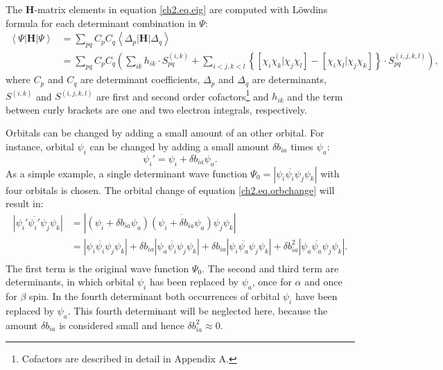 The $\mathbf{H}$-matrix elements in equation \ref{ch2.eq.eig} are computed with L\"{o}wdins formula for each determinant combination in $\Psi$:
\begin{equation}
\begin{split}
\left< \Psi | \mathbf{H} | \Psi \right> &= \sum_{pq} C_p C_q \left< \Delta_p | \mathbf{H} | \Delta_q \right> \\ 
&= \sum_{pq} C_p C_q \left(\sum_{ik} h_{ik} \cdot S^{(i,k)}_{pq} + \sum_{i<j,k<l} \left\{ \left[ \chi_i \chi_k | \chi_j \chi_l \right] - \left[ \chi_i \chi_l | \chi_j \chi_k \right] \right\} \cdot S^{(i,j,k,l)}_{pq}\right),
\end{split}
\label{ch2.eq.lowdindeterminants}
\end{equation}
where $C_p$ and $C_q$ are determinant coefficients, $\Delta_p$ and $\Delta_q$ are determinants, $S^{(i,k)}$ and $S^{(i,j,k,l)}$ are first and second order cofactors\footnote{Cofactors are described in detail in Appendix A.}  and $h_{ik}$ and the term between curly brackets are one and two electron integrals, respectively.

Orbitals can be changed by adding a small amount of an other orbital. For instance, orbital $\psi_i$ can be changed by adding a small amount $\delta b_{ia}$ times $\psi_a$:
\begin{equation}
\psi_i' = \psi_i + \delta b_{ia} \psi_a.
\label{ch2.eq.orbchange}
\end{equation}
As a simple example, a single determinant wave function $\Psi_0=|\psi_i\overline{\psi_i}\psi_j\psi_k|$ with four orbitals is chosen. The orbital change of equation \ref{ch2.eq.orbchange} will result in:
\begin{equation}    
\begin{split}
|\psi_i'\overline{\psi_i'}\psi_j\psi_k | & = |(\psi_i + \delta b_{ia} \psi_a)\overline{(\psi_i + \delta b_{ia}\psi_a)}\psi_j\psi_k |\\
& = |\psi_i\overline{\psi_i}\psi_j\psi_k| + \delta b_{ia}|\psi_a\overline{\psi_i}\psi_j\psi_k| + \delta b_{ia} |\psi_i\overline{\psi_a}\psi_j\psi_k| + \delta b^2_{ia} |\psi_a\overline{\psi_a}\psi_j\psi_k|.\\
\end{split}
\label{ch2.eq.detchange}
\end{equation}
The first term is the original wave function $\Psi_0$. The second and third term are determinants, in which orbital $\psi_i$ has been replaced by $\psi_a$, once for $\alpha$ and once for $\beta$ spin. In the fourth determinant both occurrences of orbital $\psi_i$ have been replaced by $\psi_a$. This fourth determinant will be neglected here, because the amount $\delta b_{ia}$ is considered small and hence $\delta b_{ia}^2 \approx 0$.

